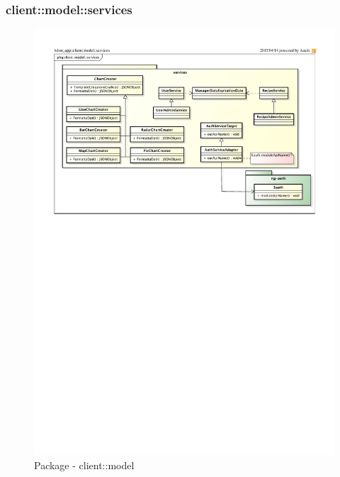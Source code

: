 %
%

%

\subsubsection{client::model::services} %
\label{ssub:bdsm_app_client_model_services}
\begin{figure}[htbp]
	\centering
	\centerline{\includegraphics[scale=1.03]{./images/client/client_model_services.pdf}}
	\caption{Package - client::model}
\end{figure}


